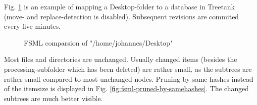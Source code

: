 Fig. \ref{fig:fsml-itemsize-pruning} is an example of mapping a Desktop-folder to a database in Treetank (move- and replace-detection is disabled). Subsequent revisions are commited every five minutes.

\begin{figure}[tb]
\caption{\label{fig:fsml-itemsize-pruning} FSML comparsion of "/home/johannes/Desktop"}
\end{figure}

Most files and directories are unchanged. Usually changed items (besides the processing-subfolder which has been deleted) are rather small, as the subtrees are rather small compared to most unchanged nodes. Pruning by same hashes instead of the itemsize is displayed in Fig. \ref{fig:fsml-pruned-by-samehashes}. The changed subtrees are much better visible. %

